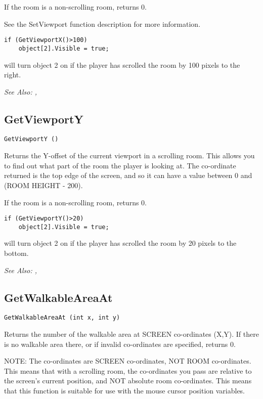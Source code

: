 If the room is a non-scrolling room, returns 0.

See the SetViewport function description for more information.

\begin{verbatim}
if (GetViewportX()>100)
    object[2].Visible = true;
\end{verbatim}
will turn object 2 on if the player has scrolled the room by 100 pixels to the right.

\it{See Also:} , 

\subsection{GetViewportY}\label{GetViewportY}%

\begin{verbatim}
GetViewportY ()
\end{verbatim}
Returns the Y-offset of the current viewport in a scrolling room. This
allows you to find out what part of the room the player is looking at.
The co-ordinate returned is the top edge of the screen, and so it can
have a value between 0 and (ROOM HEIGHT - 200).

If the room is a non-scrolling room, returns 0.

\begin{verbatim}
if (GetViewportY()>20)
    object[2].Visible = true;
\end{verbatim}
will turn object 2 on if the player has scrolled the room by 20 pixels to the bottom.

\it{See Also:} , 


\subsection{GetWalkableAreaAt}\label{GetWalkableAreaAt}%

\begin{verbatim}
GetWalkableAreaAt (int x, int y)
\end{verbatim}
Returns the number of the walkable area at SCREEN co-ordinates (X,Y).
If there is no walkable area there, or if invalid co-ordinates are specified,
returns 0.

NOTE: The co-ordinates are SCREEN co-ordinates, NOT ROOM co-ordinates. This
means that with a scrolling room, the co-ordinates you pass are relative to
the screen's current position, and NOT absolute room co-ordinates. This
means that this function is suitable for use with the mouse cursor position
variables.

